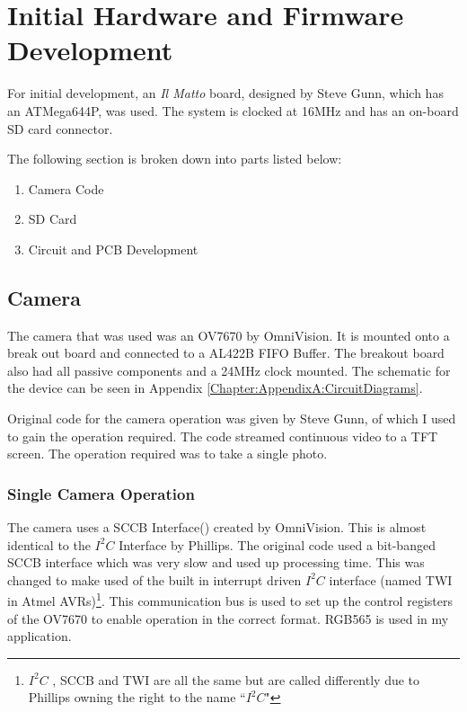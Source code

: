 \chapter{Initial Hardware and Firmware Development} \label{Chapter:HardwareDevelopment}
For initial development, an \textit{Il Matto} board, designed by Steve Gunn, which has an ATMega644P, was used. The system is clocked at 16MHz and has an on-board SD card connector. 

The following section is broken down into parts listed below:
\begin{enumerate}
\item Camera Code
\item SD Card
\item Circuit and PCB Development
\end{enumerate}

\section{Camera} \label{Section:Camera}

The camera that was used was an OV7670 by OmniVision. It is mounted onto a break out board and connected to a AL422B FIFO Buffer. The breakout board also had all passive components and a 24MHz clock mounted. The schematic for the device can be seen in Appendix \ref{Chapter:AppendixA:CircuitDiagrams}.

Original code for the camera operation was given by Steve Gunn, of which I used to gain the operation required. The code streamed continuous video to a TFT screen. The operation required was to take a single photo. 

\subsection{Single Camera Operation}

The camera uses a SCCB Interface(\cite{SCCB_Interface}) created by OmniVision. This is almost identical to the $I^{2}C$ Interface by Phillips. The original code used a bit-banged SCCB interface which was very slow and used up processing time. This was changed to make used of the built in interrupt driven $I^{2}C$ interface (named TWI in Atmel AVRs)\footnote{$I^{2}C$ , SCCB and TWI are all the same but are called differently due to Phillips owning the right to the name ``$I^{2}C$"}. This communication bus is used to set up the control registers of the OV7670 to enable operation in the correct format. RGB565 is used in my application.

